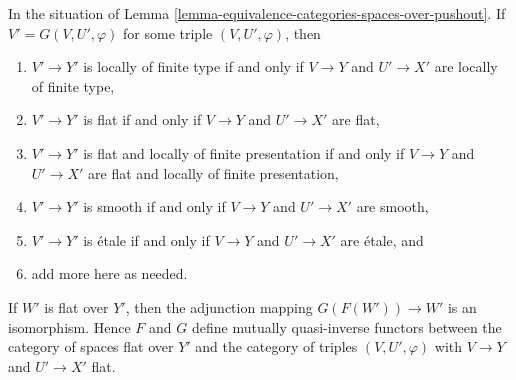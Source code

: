 \begin{lemma}
\label{lemma-equivalence-categories-spaces-pushout-flat}
In the situation of
Lemma \ref{lemma-equivalence-categories-spaces-over-pushout}.
If $V' = G(V, U', \varphi)$ for some triple $(V, U', \varphi)$, then
\begin{enumerate}
\item $V' \to Y'$ is locally of finite type if and only if $V \to Y$ and
$U' \to X'$ are locally of finite type,
\item $V' \to Y'$ is flat if and only if $V \to Y$ and $U' \to X'$ are flat,
\item $V' \to Y'$ is flat and locally of finite presentation if and only if
$V \to Y$ and $U' \to X'$ are flat and locally of finite presentation,
\item $V' \to Y'$ is smooth if and only if $V \to Y$ and $U' \to X'$ are smooth,
\item $V' \to Y'$ is \'etale if and only if $V \to Y$ and $U' \to X'$
are \'etale, and
\item add more here as needed.
\end{enumerate}
If $W'$ is flat over $Y'$, then the adjunction mapping
$G(F(W')) \to W'$ is an isomorphism. Hence $F$ and $G$ define mutually
quasi-inverse functors between the category of spaces flat over $Y'$
and the category of triples $(V, U', \varphi)$ with $V \to Y$
and $U' \to X'$ flat.
\end{lemma}

